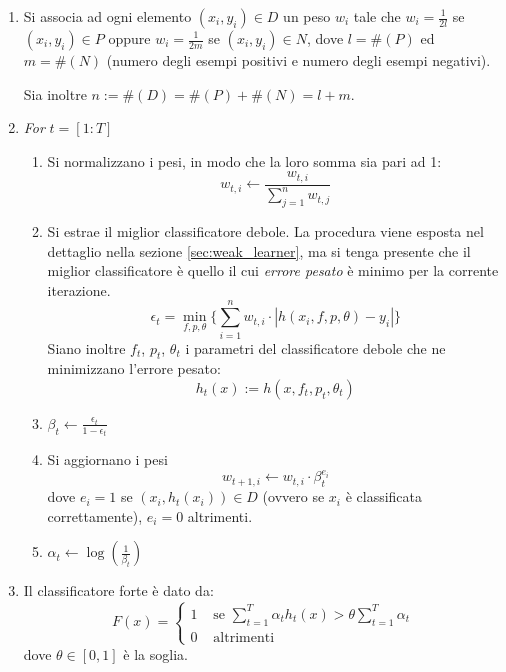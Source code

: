             \begin{enumerate}
                \item Si associa ad ogni elemento $(x_i, y_i) \in D$ un peso $w_i$ tale che $w_i = \frac{1}{2l}$ se $(x_i, y_i) \in P$ oppure $w_i = \frac{1}{2m}$ se $(x_i, y_i) \in N$, dove $l = \#(P)$ ed $m = \#(N)$ (numero degli esempi positivi e numero degli esempi negativi).

                Sia inoltre $n := \#(D) = \#(P) + \#(N) = l + m$.

                \item \emph{For} $t = [1:T]$
                \begin{enumerate}
                    \item Si normalizzano i pesi, in modo che la loro somma sia pari ad 1:
                    $$ w_{t,i} \leftarrow \frac{w_{t,i}}{\sum_{j = 1}^{n}w_{t,j}}$$

                    \item \label{adaboost_minimum_error}
                    Si estrae il miglior classificatore debole. La procedura viene esposta nel dettaglio nella sezione \ref{sec:weak_learner}, ma si tenga presente che il miglior classificatore è quello il cui \emph{errore pesato} è minimo per la corrente iterazione.
                    $$ \epsilon_t = \min_{f,p,\theta} \{
                    \sum_{i = 1}^{n} w_{t,i} \cdot |h(x_i, f, p, \theta) - y_i|
                    \} $$
                    Siano inoltre $f_t$, $p_t$, $\theta_t$ i parametri del classificatore debole che ne minimizzano l'errore pesato:
                    $$ h_t(x) := h(x, f_t, p_t, \theta_t) $$

                    \item \label{adaboost_beta} $\beta_t \leftarrow \frac{\epsilon_t}{1 - \epsilon_t}$

                    \item \label{adaboost_update_weights} Si aggiornano i pesi
                    $$ w_{t+1, i} \leftarrow w_{t,i} \cdot \beta_{t}^{e_i} $$
                    dove $e_i = 1$ se $(x_i, h_t(x_i)) \in D$ (ovvero se $x_i$ è classificata correttamente), $e_i = 0$ altrimenti.

                    \item $\alpha_t \leftarrow \log(\frac{1}{\beta_t})$
                \end{enumerate}

                \item \label{adaboost_strong_classifier} Il classificatore forte è dato da:
                \begin{equation}\label{eq:strong_classifier}
                    F(x) = 
                    \begin{cases}
                        1 & \text{ se } \sum_{t = 1}^{T} \alpha_t h_t(x) > \theta \sum_{t = 1}^{T} \alpha_t \\
                        0 & \text{ altrimenti }
                    \end{cases}
                \end{equation}
                dove $\theta \in [0,1]$ è la soglia.
            \end{enumerate}

